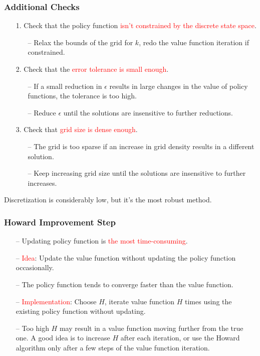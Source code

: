 \documentclass[aspectratio=169, 11pt]{beamer}
\begin{document}
\begin{frame}
\frametitle{Additional Checks}
  \begin{itemize}
    \item[1.] Check that the policy function \textcolor{red}{isn't constrained by the discrete state space}.
    \begin{itemize}
      \item[--] Relax the bounds of the grid for $k$, redo the value function iteration if constrained.
    \end{itemize}
    \bigskip
    \item[2.] Check that the \textcolor{red}{error tolerance is small enough}.
    \begin{itemize}
      \item[--] If a small reduction in $\epsilon$ results in large changes in the value of policy functions, the tolerance is too high.
      \item[--] Reduce $\epsilon$ until the solutions are insensitive to further reductions.
    \end{itemize}
    \bigskip
    \item[3.] Check that \textcolor{red}{grid size is dense enough}.
    \begin{itemize}
      \item[--] The grid is too sparse if an increase in grid density results in a different solution.
      \item[--] Keep increasing grid size until the solutions are insensitive to further increases.
    \end{itemize}
  \end{itemize}
  \bigskip
  Discretization is considerably low, but it's the most robust method.
\end{frame}

\begin{frame}
\frametitle{Howard Improvement Step}
  \begin{itemize}
    \item[--] Updating policy function is \textcolor{red}{the most time-consuming}.
    \bigskip
    \item[--] \textcolor{red}{Idea}: Update the value function without updating the policy function occasionally.
    \item[--] The policy function tends to converge faster than the value function.
    \bigskip
    \item[--] \textcolor{red}{Implementation}: Choose $H$, iterate value function $H$ times using the existing policy function without updating.
    \item[--] Too high $H$ may result in a value function moving further from the true one. A good idea is to increase $H$ after each iteration, or use the Howard algorithm only after a few steps of the value function iteration.
  \end{itemize}
\end{frame}
\end{document}

